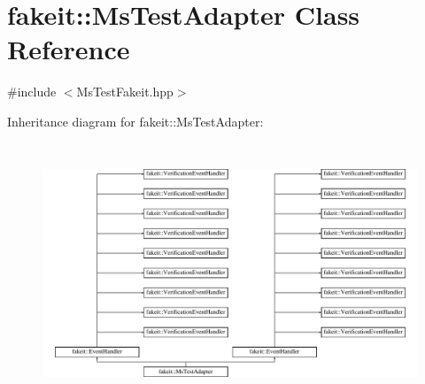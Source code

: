 \hypertarget{classfakeit_1_1MsTestAdapter}{}\section{fakeit\+::Ms\+Test\+Adapter Class Reference}
\label{classfakeit_1_1MsTestAdapter}


{\ttfamily \#include $<$Ms\+Test\+Fakeit.\+hpp$>$}

Inheritance diagram for fakeit\+::Ms\+Test\+Adapter\+:\begin{figure}[H]
\begin{center}
\leavevmode
\includegraphics[height=7.777778cm]{classfakeit_1_1MsTestAdapter}
\end{center}
\end{figure}
